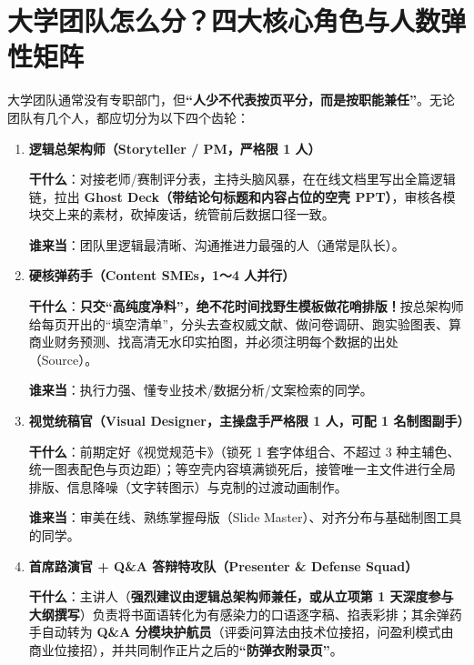 \documentclass[UTF8,a4paper,11pt,fontset=none]{ctexart}
\newcommand{\secstart}[1]{\needspace{5.2\baselineskip}\section{#1}}
\begin{document}
\secstart{大学团队怎么分？四大核心角色与人数弹性矩阵}

大学团队通常没有专职部门，但\textbf{“人少不代表按页平分，而是按职能兼任”}。无论团队有几个人，都应切分为以下四个齿轮：

\begin{enumerate}[itemsep=0.62em]
\item \textbf{逻辑总架构师（Storyteller / PM，严格限 1 人）}\par
\vspace{0.12em}\hspace*{0.35em}\textbf{干什么}：对接老师/赛制评分表，主持头脑风暴，在在线文档里写出全篇逻辑链，拉出 \textbf{Ghost Deck（带结论句标题和内容占位的空壳 PPT）}，审核各模块交上来的素材，砍掉废话，统管前后数据口径一致。\par
\vspace{0.1em}\hspace*{0.35em}\textbf{谁来当}：团队里逻辑最清晰、沟通推进力最强的人（通常是队长）。

\item \textbf{硬核弹药手（Content SMEs，1～4 人并行）}\par
\vspace{0.12em}\hspace*{0.35em}\textbf{干什么}：\textbf{只交“高纯度净料”，绝不花时间找野生模板做花哨排版！}按总架构师给每页开出的“填空清单”，分头去查权威文献、做问卷调研、跑实验图表、算商业财务预测、找高清无水印实拍图，并必须注明每个数据的出处（Source）。\par
\vspace{0.1em}\hspace*{0.35em}\textbf{谁来当}：执行力强、懂专业技术/数据分析/文案检索的同学。

\item \textbf{视觉统稿官（Visual Designer，主操盘手严格限 1 人，可配 1 名制图副手）}\par
\vspace{0.12em}\hspace*{0.35em}\textbf{干什么}：前期定好《视觉规范卡》（锁死 1 套字体组合、不超过 3 种主辅色、统一图表配色与页边距）；等空壳内容填满锁死后，接管唯一主文件进行全局排版、信息降噪（文字转图示）与克制的过渡动画制作。\par
\vspace{0.1em}\hspace*{0.35em}\textbf{谁来当}：审美在线、熟练掌握母版（Slide Master）、对齐分布与基础制图工具的同学。

\item \textbf{首席路演官 + Q\&A 答辩特攻队（Presenter \& Defense Squad）}\par
\vspace{0.12em}\hspace*{0.35em}\textbf{干什么}：主讲人（\textbf{强烈建议由逻辑总架构师兼任，或从立项第 1 天深度参与大纲撰写}）负责将书面语转化为有感染力的口语逐字稿、掐表彩排；其余弹药手自动转为 \textbf{Q\&A 分模块护航员}（评委问算法由技术位接招，问盈利模式由商业位接招），并共同制作正片之后的\textbf{“防弹衣附录页”}。
\end{enumerate}
\end{document}
